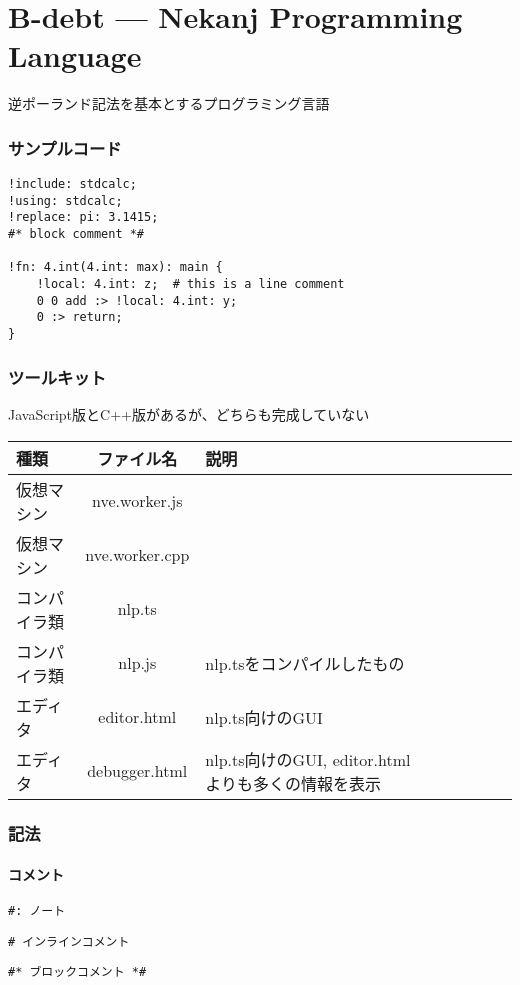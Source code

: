 \part{B-debt --- Nekanj Programming Language}

逆ポーランド記法を基本とするプログラミング言語

\section{サンプルコード}
\begin{lstlisting}[]
!include: stdcalc;
!using: stdcalc;
!replace: pi: 3.1415;
#* block comment *#

!fn: 4.int(4.int: max): main {
    !local: 4.int: z;  # this is a line comment
    0 0 add :> !local: 4.int: y;
    0 :> return;
}
\end{lstlisting}

\section{ツールキット}
JavaScript版とC++版があるが、どちらも完成していない
\begin{table}[h]
    \centering
    \begin{tabular}{lcllllll}
        \hline
        種類 & ファイル名 & 説明 \\
        \hline \hline
        仮想マシン & nve.worker.js \\
        仮想マシン & nve.worker.cpp \\
        \hline
        コンパイラ類 & nlp.ts \\
        コンパイラ類 & nlp.js & nlp.tsをコンパイルしたもの \\
        \hline
        エディタ & editor.html & nlp.ts向けのGUI \\
        エディタ & debugger.html & nlp.ts向けのGUI, editor.htmlよりも多くの情報を表示 \\
        \hline
    \end{tabular}
\end{table}


\section{記法}

\subsection{コメント}
\begin{lstlisting}[]
#: ノート
\end{lstlisting}
\begin{lstlisting}[]
# インラインコメント
\end{lstlisting}
\begin{lstlisting}[]
#* ブロックコメント *#
\end{lstlisting}
